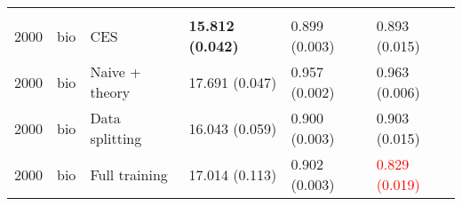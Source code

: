 \begin{tabular}{rlllll}
\addlinespace[0.3em]
\multicolumn{6}{l}{\textbf{2000}}\\
\hspace{1em}2000 & bio & CES & \textbf{15.812 (0.042)} & 0.899 (0.003) & 0.893 (0.015)\\
\hspace{1em}2000 & bio & Naive + theory & 17.691 (0.047) & 0.957 (0.002) & 0.963 (0.006)\\
\hspace{1em}2000 & bio & Data splitting & 16.043 (0.059) & 0.900 (0.003) & 0.903 (0.015)\\
\hspace{1em}2000 & bio & Full training & 17.014 (0.113) & 0.902 (0.003) & \textcolor{red}{0.829 (0.019)}\\
\bottomrule
\end{tabular}
